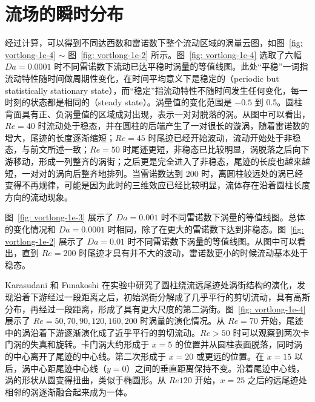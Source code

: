 \section{流场的瞬时分布}\label{sec: transient}

经过计算，可以得到不同达西数和雷诺数下整个流动区域的涡量云图，如图~\ref{fig: vortlong-1e-4} $\sim$ 图~\ref{fig: vortlong-1e-2} 所示。图~\ref{fig: vortlong-1e-4} 选取了六幅 $Da=0.0001$ 时不同雷诺数下流动已达平稳时涡量的等值线图。此处“平稳”一词指流动特性随时间做周期性变化，在时间平均意义下是稳定的（periodic but statistically stationary state），而“稳定”指流动特性不随时间发生任何变化，每一时刻的状态都是相同的（steady state）。涡量值的变化范围是 $-0.5$ 到 0.5。圆柱背面具有正、负涡量值的区域成对出现，表示一对对脱落的涡。从图中可以看出，$Re=40$ 时流动处于稳态，并在圆柱的后端产生了一对很长的漩涡，随着雷诺数的增大，尾迹的长度逐渐缩短；$Re=45$ 时尾迹已经开始波动，流动开始处于非稳态，与前文所述一致；$Re=50$ 时尾迹更短，非稳态已比较明显，涡脱落之后向下游移动，形成一列整齐的涡街；之后更是完全进入了非稳态，尾迹的长度也越来越短，一对对的涡向后整齐地排列。当雷诺数达到 200 时，离圆柱较远处的涡已经变得不再规律，可能是因为此时的三维效应已经比较明显，流体存在沿着圆柱长度方向的流动现象。

图~\ref{fig: vortlong-1e-3} 展示了 $Da=0.001$ 时不同雷诺数下涡量的等值线图。总体的变化情况和 $Da=0.0001$ 时相同，除了在更大的雷诺数下达到非稳态。图~\ref{fig: vortlong-1e-2} 展示了 $Da=0.01$ 时不同雷诺数下涡量的等值线图。从图中可以看出，直到 $Re=200$ 时尾迹才具有并不大的波动，雷诺数更小的时候流动基本处于稳态。

Karasudani 和 Funakoshi\cite{Karasudani1994} 在实验中研究了圆柱绕流远尾迹处涡街结构的演化，发现沿着下游经过一段距离之后，初始涡街分解成了几乎平行的剪切流动，具有高斯分布，再经过一段距离，形成了具有更大尺度的第二涡街。图~\ref{fig: vortlong-1e-4} 展示了 $Re=50,70,90,120,160,200$ 时涡量的演化情况。从 $Re=70$ 开始，尾迹中的涡沿着下游逐渐演化成了近乎平行的剪切流动。$Re>50$ 时可以观察到两次卡门涡的失真和旋转。卡门涡大约形成于 $x=5$ 的位置并从圆柱表面脱落，同时涡的中心离开了尾迹的中心线。第二次形成于 $x=20$ 或更远的位置。在 $x=15$ 以后，涡中心距尾迹中心线（$y=0$）之间的垂直距离保持不变。沿着尾迹中心线，涡的形状从圆变得扭曲，类似于椭圆形。从 $Re120$ 开始，$x=25$ 之后的远尾迹处相邻的涡逐渐融合起来成为一体。

